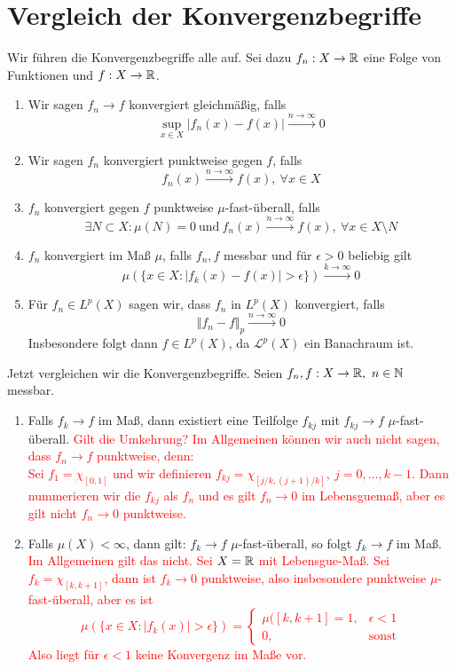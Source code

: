 \documentclass[a4paper,12pt]{scrartcl}
\begin{document}
    \section{Vergleich der Konvergenzbegriffe}
    \begin{defn} Wir führen die Konvergenzbegriffe alle auf. Sei dazu $f_n:X\to \mathbb{R}$ eine Folge von Funktionen und $f:X\to \mathbb{R}$.
        \begin{enumerate}
            \item Wir sagen $f_n \to f$ konvergiert gleichmäßig, falls
            \[
            \sup_{x\in X} \vert f_n(x)-f(x)\vert \xrightarrow{n\to \infty} 0    
            \] 
        \item Wir sagen $f_n$ konvergiert punktweise gegen $f$, falls 
        \[
        f_n(x) \xrightarrow{n\to \infty} f(x), \ \forall x\in X    
        \]
        \item $f_n$ konvergiert gegen $f$ punktweise $\mu$-fast-überall, falls 
        \[
        \exists N\subset X:  \mu(N)= 0 \ \text{und} \ f_n(x)\xrightarrow{n\to \infty} f(x), \ \forall x\in X\setminus N    
        \]
        \item $f_n$ konvergiert im Maß $\mu$, falls $f_n,f$ messbar und für $\epsilon>0$ beliebig gilt
        \[
        \mu(\{x\in X : \vert f_k(x)-f(x)\vert > \epsilon\}) \xrightarrow{k\to \infty} 0    
        \]
        \item Für $f_n\in L^p(X)$ sagen wir, dass $f_n$ in $L^p(X)$ konvergiert, falls
        \[
        \Vert f_n - f\Vert_p \xrightarrow{n\to \infty} 0    
        \]
        Insbesondere folgt dann $f\in L^p(X)$, da $\mathscr{L}^p(X)$ ein Banachraum ist.
        \end{enumerate}
    \end{defn}
    Jetzt vergleichen wir die Konvergenzbegriffe. Seien $f_n,f:X\to \mathbb{R}, \ n\in \mathbb{N}$ messbar. 
    \begin{enumerate}
        \item Falls $f_k \to f$ im Maß, dann existiert eine Teilfolge $f_{kj}$ mit $f_{kj}\to f$ $\mu$-fast-überall.
        \textcolor{red}{Gilt die Umkehrung? Im Allgemeinen können wir auch nicht sagen, dass $f_n\to f$ punktweise, denn:\\
        Sei $f_1=\chi_{[0,1]}$ und wir definieren $f_{kj} = \chi_{[j/k,(j+1)/k]}, \ j=0,\ldots,k-1$. Dann nummerieren wir die $f_{kj}$ als $f_n$ und es gilt $f_n\to 0$ im Lebensguemaß, aber es gilt nicht $f_n \to 0$ punktweise.}
        \item Falls \textbf{$\mu(X)<\infty$}, dann gilt: $f_k\to f$ $\mu$-fast-überall, so folgt $f_k\to f$ im Maß.
        \textcolor{red}{\\ Im Allgemeinen gilt das nicht. Sei $X=\mathbb{R}$ mit Lebensgue-Maß. Sei $f_k=\chi_{[k,k+1]}$, dann ist $f_k\to 0$ punktweise, also insbesondere punktweise $\mu$-fast-überall, aber es ist
        \[
        \mu(\{x\in X : \vert f_k(x)\vert > \epsilon\}) = \begin{cases} \mu([k,k+1]=1, & \epsilon<1\\
        0, & \text{sonst} \end{cases}    
        \] Also liegt für $\epsilon <1$ keine Konvergenz im Maße vor.}
    \end{enumerate}
\end{document}
